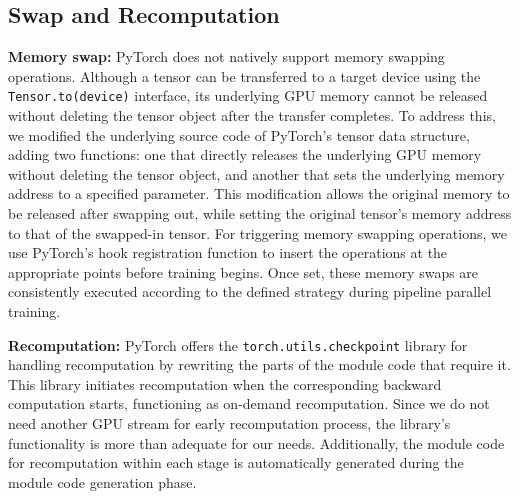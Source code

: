 \subsection{Swap and Recomputation}
\textbf{Memory swap:} PyTorch does not natively support memory swapping operations.
Although a tensor can be transferred to a target device using the \texttt{Tensor.to(device)} interface,
its underlying GPU memory cannot be released without deleting the tensor object after the transfer completes.
To address this, we modified the underlying source code of PyTorch’s tensor data structure,
adding two functions: one that directly releases the underlying GPU memory without deleting the tensor object,
and another that sets the underlying memory address to a specified parameter.
This modification allows the original memory to be released after swapping out,
while setting the original tensor’s memory address to that of the swapped-in tensor.
For triggering memory swapping operations,
we use PyTorch's hook registration function to insert the operations at the appropriate points before training begins.
Once set, these memory swaps are consistently executed according to the defined strategy during pipeline parallel training.

\textbf{Recomputation:} PyTorch offers the \texttt{torch.utils.checkpoint} library for
handling recomputation by rewriting the parts of the module code that require it.
This library initiates recomputation when the corresponding backward computation starts,
functioning as on-demand recomputation.
Since we do not need another GPU stream for early recomputation process,
the library’s functionality is more than adequate for our needs.
Additionally, the module code for recomputation within each stage is
automatically generated during the module code generation phase.
